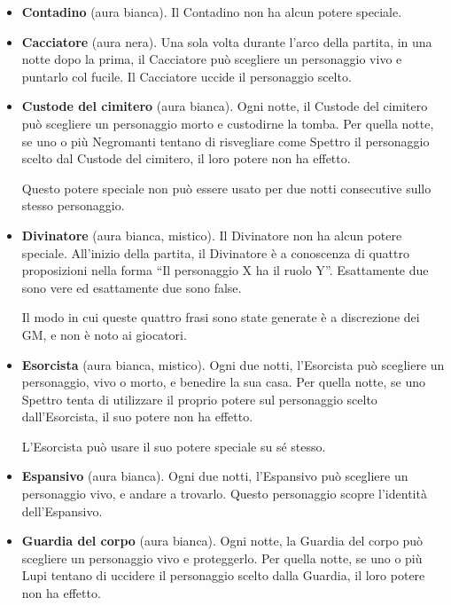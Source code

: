 \documentclass[a4paper,10pt]{article}
\begin{document}
\begin{itemize}
 \item {\bf Contadino} (aura bianca). Il Contadino non ha alcun potere speciale.

 \item {\bf Cacciatore} (aura nera). Una sola volta durante l'arco della
partita, in una notte dopo la prima, il Cacciatore può scegliere un personaggio vivo e puntarlo col fucile.
 Il Cacciatore uccide il personaggio scelto.
 
 \item {\bf Custode del cimitero} (aura bianca). Ogni notte, il Custode del
cimitero può scegliere un personaggio morto e custodirne la tomba. Per quella
notte, se uno o più Negromanti tentano di risvegliare come Spettro il
personaggio scelto dal Custode del cimitero, il loro potere non ha effetto.
 
 Questo potere speciale non può essere usato per due notti consecutive sullo
stesso personaggio.

 \item {\bf Divinatore} (aura bianca, mistico). Il Divinatore non ha alcun
potere speciale. All'inizio della partita, il Divinatore è a conoscenza di
quattro proposizioni nella forma ``Il personaggio X ha il ruolo Y''. Esattamente
due sono vere ed esattamente due sono false.
 
 Il modo in cui queste quattro frasi sono state generate è a discrezione dei GM,
e non è noto ai giocatori.

 \item {\bf Esorcista} (aura bianca, mistico). Ogni due notti, l'Esorcista può
scegliere un personaggio, vivo o morto, e benedire la sua casa.
 Per quella notte, se uno Spettro tenta di utilizzare il proprio potere sul
personaggio scelto dall'Esorcista, il suo potere non ha effetto.
 
 L'Esorcista può usare il suo potere speciale su sé stesso.
 
 \item {\bf Espansivo} (aura bianca). Ogni due notti, l'Espansivo può scegliere
un personaggio vivo, e andare a trovarlo. Questo personaggio scopre l'identità
dell'Espansivo.

 \item {\bf Guardia del corpo} (aura bianca). Ogni notte, la Guardia del corpo
può scegliere un personaggio vivo e proteggerlo. Per quella notte, se uno o più
Lupi tentano di uccidere il personaggio scelto dalla Guardia, il loro potere non
ha effetto.
 

\end{itemize}
\end{document}
